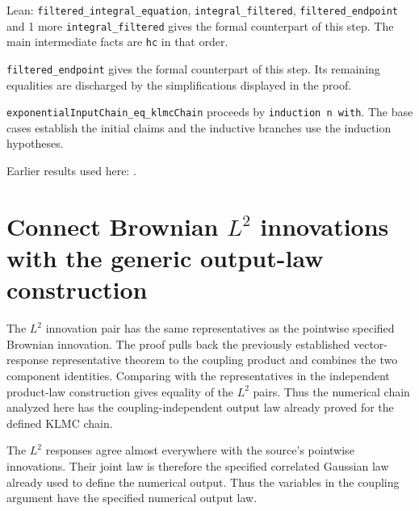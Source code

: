 \documentclass[11pt,a4paper]{article}
\begin{document}
\begin{leanbox}{Lean: \texttt{filtered\_\allowbreak{}integral\_\allowbreak{}equation}, \texttt{integral\_\allowbreak{}filtered}, \texttt{filtered\_\allowbreak{}endpoint} and 1 more}
\texttt{integral\_\allowbreak{}filtered} gives the formal counterpart of this step. The main intermediate facts are \texttt{hc} in that order.




\texttt{filtered\_\allowbreak{}endpoint} gives the formal counterpart of this step. Its remaining equalities are discharged by the simplifications displayed in the proof.




\texttt{exponential\allowbreak{}Input\allowbreak{}Chain\_\allowbreak{}eq\_\allowbreak{}klmc\allowbreak{}Chain} proceeds by \texttt{induction n with}. The base cases establish the initial claims and the inductive branches use the induction hypotheses.
\end{leanbox}


Earlier results used here: \cite[Section~3.17.1]{LangevinLean2026ULASC}.

\section{\texorpdfstring{Connect Brownian \(L^{2}\) innovations with the generic output-law construction}{Connect Brownian L² innovations with the generic output-law construction}}


The \(L^{2}\) innovation pair has the same representatives as the pointwise specified Brownian innovation. The proof pulls back the previously established vector-response representative theorem to the coupling product and combines the two component identities. Comparing with the representatives in the independent product-law construction gives equality of the \(L^{2}\) pairs. Thus the numerical chain analyzed here has the coupling-independent output law already proved for the defined KLMC chain.



The \(L^{2}\) responses agree almost everywhere with the source’s pointwise innovations. Their joint law is therefore the specified correlated Gaussian law already used to define the numerical output. Thus the variables in the coupling argument have the specified numerical output law.
\end{document}
